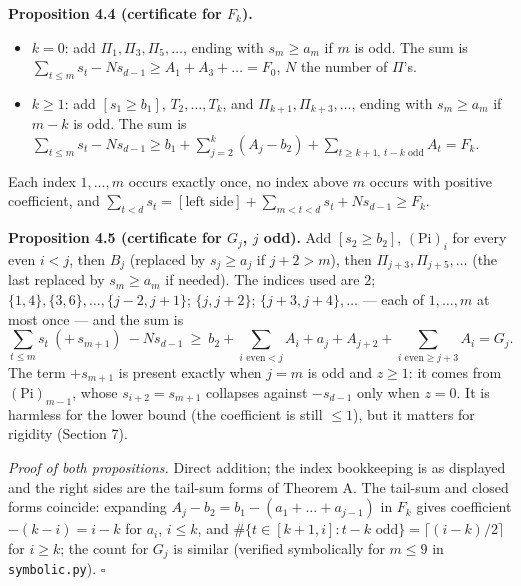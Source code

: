 \documentclass[
  11pt,
  a4paper,
]{article}
\providecommand{\tightlist}{%
  \setlength{\itemsep}{0pt}\setlength{\parskip}{0pt}}
\begin{document}
\textbf{Proposition 4.4 (certificate for \(F_k\)).}

\begin{itemize}
\tightlist
\item
  \(k=0\): add \(\Pi_1,\allowbreak{}\Pi_3,\allowbreak{}\Pi_5,\allowbreak{}\dots\), ending with \(s_m\ge a_m\)
  if \(m\) is odd. The sum is
  \(\sum_{t\le m}s_t-Ns_{d-1}\ge A_1+A_3+\dots=F_0\), \(N\) the number
  of \(\Pi\)'s.
\item
  \(k\ge1\): add \([s_1\ge b_1]\), \(T_2,\allowbreak{}\dots,\allowbreak{}T_k\), and
  \(\Pi_{k+1},\allowbreak{}\Pi_{k+3},\allowbreak{}\dots\), ending with \(s_m\ge a_m\) if \(m-k\)
  is odd. The sum is
  \(\sum_{t\le m}s_t-Ns_{d-1}\ge b_1+\sum_{j=2}^k(A_j-b_2)+\sum_{t\ge k+1,\allowbreak{}\ t-k\text{ odd}}A_t=F_k\).
\end{itemize}

Each index \(1,\allowbreak{}\dots,\allowbreak{}m\) occurs exactly once, no index above \(m\)
occurs with positive coefficient, and
\(\sum_{t<d}s_t=[\text{left side}]+\sum_{m<t<d}s_t+Ns_{d-1}\ge F_k\).

\textbf{Proposition 4.5 (certificate for \(G_j\), \(j\) odd).} Add
\([s_2\ge b_2]\), \((\mathrm{Pi})_i\) for every even \(i<j\), then
\(B_j\) (replaced by \(s_j\ge a_j\) if \(j+2>m\)), then
\(\Pi_{j+3},\allowbreak{}\Pi_{j+5},\allowbreak{}\dots\) (the last replaced by \(s_m\ge a_m\) if
needed). The indices used are \(2\);
\(\{1,\allowbreak{}4\},\allowbreak{}\{3,\allowbreak{}6\},\allowbreak{}\dots,\allowbreak{}\{j-2,\allowbreak{}j+1\}\); \(\{j,\allowbreak{}j+2\}\);
\(\{j+3,\allowbreak{}j+4\},\allowbreak{}\dots\) --- each of \(1,\allowbreak{}\dots,\allowbreak{}m\) at most once --- and the
sum is
\[\sum_{t\le m}s_t\ (+\,s_{m+1})\ -Ns_{d-1}\ \ge\ b_2+\sum_{i\text{ even}<j}A_i+a_j+A_{j+2}+\sum_{i\text{ even}\ge j+3}A_i=G_j .\]
The term \(+s_{m+1}\) is present exactly when \(j=m\) is odd and
\(z\ge1\): it comes from \((\mathrm{Pi})_{m-1}\), whose
\(s_{i+2}=s_{m+1}\) collapses against \(-s_{d-1}\) only when \(z=0\). It
is harmless for the lower bound (the coefficient is still \(\le1\)), but
it matters for rigidity (Section 7).

\emph{Proof of both propositions.} Direct addition; the index
bookkeeping is as displayed and the right sides are the tail-sum forms
of Theorem A. The tail-sum and closed forms coincide: expanding
\(A_j-b_2=b_1-(a_1+\dots+a_{j-1})\) in \(F_k\) gives coefficient
\(-(k-i)=i-k\) for \(a_i\), \(i\le k\), and
\(\#\{t\in[k+1,\allowbreak{}i]:t-k\text{ odd}\}=\lceil (i-k)/2\rceil\) for
\(i\ge k\); the count for \(G_j\) is similar (verified symbolically for
\(m\le9\) in {\small\texttt{symbolic.\allowbreak{}py}}). \(\square\)
\end{document}
